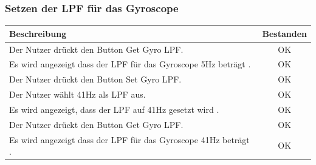 \documentclass[a4paper,12pt]{article}
\newcommand{\testok}[0]{
	\cellcolor{green!25} OK
}
\begin{document}
\subsubsection{Setzen der LPF für das Gyroscope}
\begin{tabular}{ | p{12cm} | c| }
	\hline
	\textbf{Beschreibung} & \textbf{Bestanden}\\
	\hline
	Der Nutzer drückt den Button \glqq{}Get Gyro LPF\grqq{}. & \testok \\
	\hline
	Es wird angezeigt dass der LPF für das Gyroscope 5Hz beträgt . & \testok \\
	\hline
	Der Nutzer drückt den Button \glqq{}Set Gyro LPF\grqq{}. & \testok \\
	\hline
	Der Nutzer wählt 41Hz als LPF aus. & \testok \\
	\hline
	Es wird angezeigt, dass der LPF auf 41Hz gesetzt wird . & \testok \\
	\hline
	Der Nutzer drückt den Button \glqq{}Get Gyro LPF\grqq{}. & \testok \\
	\hline
	Es wird angezeigt dass der LPF für das Gyroscope 41Hz beträgt . & \testok \\
	\hline
\end{tabular}
\\ \\ \\ \\
\begin{figure}[h]
	\centering
\end{figure}
\FloatBarrier
\end{document}
